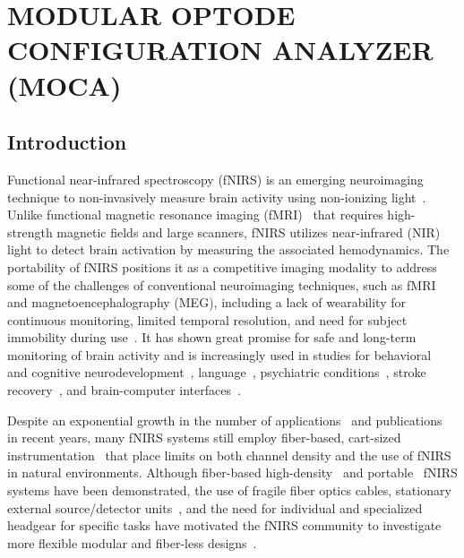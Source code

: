 
\chapter{MODULAR OPTODE CONFIGURATION ANALYZER (MOCA)} %
\label{chap:moca}

\section{Introduction}
\label{sec:introduction}
Functional near-infrared spectroscopy (fNIRS) is an emerging neuroimaging technique to non-invasively measure brain activity using non-ionizing light~\cite{Ferrari2012}. Unlike functional magnetic resonance imaging (fMRI)~\cite{Heinzel2013} that requires high-strength magnetic fields and large scanners, fNIRS utilizes near-infrared (NIR) light to detect brain activation by measuring the associated hemodynamics. The portability of fNIRS positions it as a competitive imaging modality to address some of the challenges of conventional neuroimaging techniques, such as fMRI and magnetoencephalography (MEG), including a lack of wearability for continuous monitoring, limited temporal resolution, and need for subject immobility during use~\cite{Yucel2017}. It has shown great promise for safe and long-term monitoring of brain activity and is increasingly used in studies for behavioral~\cite{McDonald2018} and cognitive neurodevelopment~\cite{Aslin2015, Vanderwert2014, Wilcox2015, Soltanlou2018}, language~\cite{Quaresima2012, Rossi2012}, psychiatric conditions~\cite{Ehlis2014, Kumar2017}, stroke recovery~\cite{Yang2019}, and brain-computer interfaces~\cite{Naseer2015, Ahn2017, Hong2018}. 

Despite an exponential growth in the number of applications~\cite{Boas2014, Quaresima2019} and publications~\cite{Yucel2017} in recent years, many fNIRS systems still employ fiber-based, cart-sized instrumentation~\cite{Scholkmann2014} that place limits on both channel density and the use of fNIRS in natural environments. Although fiber-based high-density~\cite{Eggebrecht2014} and portable~\cite{Wheelock2019} fNIRS systems have been demonstrated, the use of fragile fiber optics cables, stationary external source/detector units~\cite{Oxymon2017, Techen2018}, and the need for individual and specialized headgear for specific tasks have motivated the fNIRS community to investigate more flexible modular and fiber-less designs~\cite{Zhao2017, Curtin2018}.

